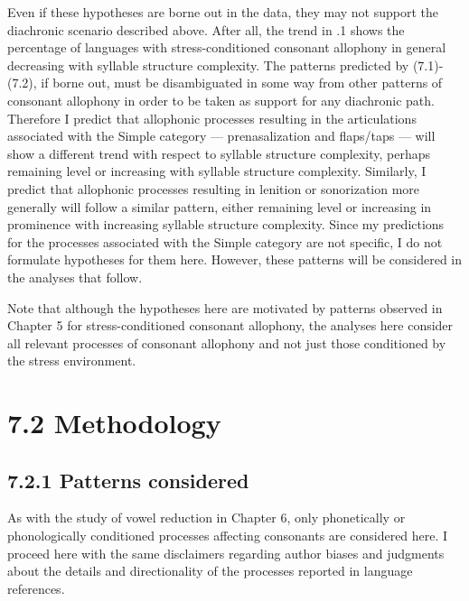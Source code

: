   Even if these hypotheses are borne out in the data, they may not support the diachronic scenario described above. After all, the trend in .1 shows the percentage of languages with stress-conditioned consonant allophony in general decreasing with syllable structure complexity. The patterns predicted by (7.1)-(7.2), if borne out, must be disambiguated in some way from other patterns of consonant allophony in order to be taken as support for any diachronic path. Therefore I predict that allophonic processes resulting in the articulations associated with the Simple category — prenasalization and flaps/taps — will show a different trend with respect to syllable structure complexity, perhaps remaining level or increasing with syllable structure complexity. Similarly, I predict that allophonic processes resulting in lenition or sonorization more generally will follow a similar pattern, either remaining level or increasing in prominence with increasing syllable structure complexity. Since my predictions for the processes associated with the Simple category are not specific, I do not formulate hypotheses for them here. However, these patterns will be considered in the analyses that follow.

  Note that although the hypotheses here are motivated by patterns observed in Chapter 5 for stress-conditioned consonant allophony, the analyses here consider all relevant processes of consonant allophony and not just those conditioned by the stress environment.

\section{7.2 Methodology}
\subsection{7.2.1 Patterns considered}

  As with the study of vowel reduction in Chapter 6, only phonetically or phonologically conditioned processes affecting consonants are considered here. I proceed here with the same disclaimers regarding author biases and judgments about the details and directionality of the processes reported in language references.

